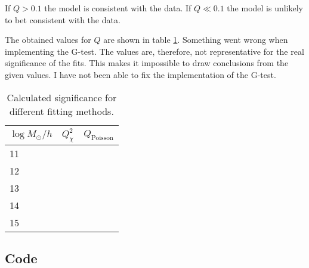 If $Q>0.1$ the model is consistent with the data. If $Q \ll 0.1$ the model is unlikely to bet consistent with the data.

The obtained values for $Q$ are shown in table \ref{tab:significance}. Something went wrong when implementing the G-test. The values are, therefore, not representative for the real significance of the fits. This makes it impossible to draw conclusions from the given values. I have not been able to fix the implementation of the G-test.

\begin{table}[h]
    \caption{Calculated significance for different fitting methods.}
    \label{tab:significance}
    \centering
    \begin{tabular}{l|ll}
    $\log M_\odot/h$ & \multicolumn{1}{c}{$Q_\chi^2$}                           & \multicolumn{1}{c}{$Q_\mathrm{Poisson}$}            \\ \hline
    11          &  &  \\
    12          &  &  \\
    13          &  &  \\
    14          &  &  \\
    15          &  & 
    \end{tabular}
\end{table}

\newpage

\subsection*{Code}

